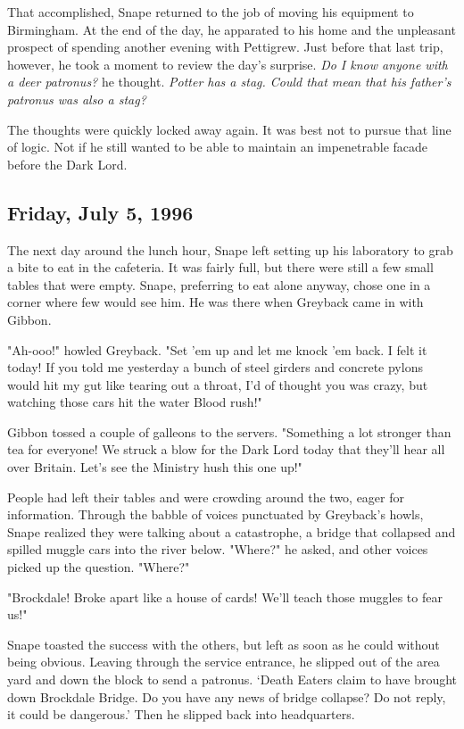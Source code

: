 That accomplished, Snape returned to the job of moving his equipment to Birmingham. At the end of the day, he apparated to his home and the unpleasant prospect of spending another evening with Pettigrew. Just before that last trip, however, he took a moment to review the day's surprise. \emph{Do I know anyone with a deer patronus?} he thought. \emph{Potter has a stag. Could that mean that his father's patronus was also a stag?}

The thoughts were quickly locked away again. It was best not to pursue that line of logic. Not if he still wanted to be able to maintain an impenetrable facade before the Dark Lord.

\subsection{Friday, July 5, 1996}

The next day around the lunch hour, Snape left setting up his laboratory to grab a bite to eat in the cafeteria. It was fairly full, but there were still a few small tables that were empty. Snape, preferring to eat alone anyway, chose one in a corner where few would see him. He was there when Greyback came in with Gibbon.

"Ah-ooo!" howled Greyback. "Set 'em up and let me knock 'em back. I felt it today! If you told me yesterday a bunch of steel girders and concrete pylons would hit my gut like tearing out a throat, I'd of thought you was crazy, but watching those cars hit the water{\el} Blood rush!"

Gibbon tossed a couple of galleons to the servers. "Something a lot stronger than tea for everyone! We struck a blow for the Dark Lord today that they'll hear all over Britain. Let's see the Ministry hush this one up!"

People had left their tables and were crowding around the two, eager for information. Through the babble of voices punctuated by Greyback's howls, Snape realized they were talking about a catastrophe, a bridge that collapsed and spilled muggle cars into the river below. "Where?" he asked, and other voices picked up the question. "Where?"

"Brockdale! Broke apart like a house of cards! We'll teach those muggles to fear us!"

Snape toasted the success with the others, but left as soon as he could without being obvious. Leaving through the service entrance, he slipped out of the area yard and down the block to send a patronus. `Death Eaters claim to have brought down Brockdale Bridge. Do you have any news of bridge collapse? Do not reply, it could be dangerous.' Then he slipped back into headquarters.

